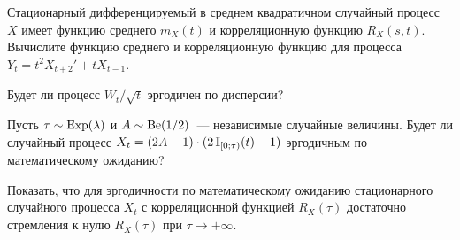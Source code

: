 \documentclass[12pt]{article}
\begin{document}
\begin{exercise}
    Стационарный дифференцируемый в среднем квадратичном случайный процесс $ X $
    имеет функцию среднего $ m_X(t) $ и корреляционную функцию $ R_X(s, t) $.
    Вычислите функцию среднего и корреляционную функцию для процесса $ Y_t = t^2 X_{t + 2}' + t X_{t - 1} $.
\end{exercise}


\begin{exercise}
    Будет ли процесс $ W_t / \sqrt{t} $ эргодичен по дисперсии?
\end{exercise}


\begin{exercise}
    Пусть $ \tau \sim \textnormal{Exp}(\lambda) $ и $ A \sim \textnormal{Be}(1/2) $~--- независимые случайные величины.
    Будет ли случайный процесс $ X_t = (2A - 1) \cdot (2 \, \mathbb{I}_{[0;\tau)}(t) - 1) $ эргодичным по математическому ожиданию?
\end{exercise}


\begin{exercise}
    Показать, что для эргодичности по математическому ожиданию стационарного случайного процесса $ X_t $
    с корреляционной функцией $ R_X(\tau) $ достаточно стремления к нулю $ R_X(\tau) $ при $ \tau \to +\infty $.
\end{exercise}
\end{document}
